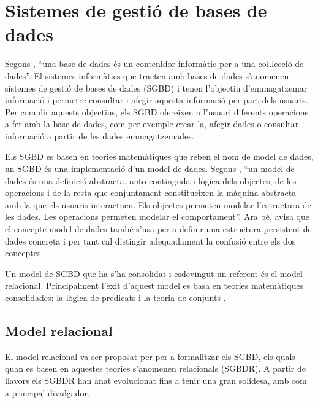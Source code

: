 \section[SGBD]{Sistemes de gestió de bases de dades}
\label{sec:art:sgbd}


Segons \textcite{date:introduction}, ``una base de dades és un contenidor informàtic per a una co\l.lecció de dades''. El sistemes informàtics que tracten amb bases de dades s'anomenen sistemes de gestió de bases de dades (SGBD) i tenen l'objectiu d'emmagatzemar informació i permetre consultar i afegir aquesta informació  per part dels usuaris.
Per complir aquests objectius, els SGBD ofereixen a l'usuari diferents operacions a fer amb la base de dades, com per exemple crear-la, afegir dades o consultar informació a partir de les dades emmagatzemades.

Els SGBD es basen en teories matemàtiques que reben el nom de model de dades, un SGBD és una implementació d'un model de dades.
Segons \citeauthor{date:introduction}, ``un model de dades és una definició abstracta, auto continguda i lògica dels objectes, de les operacions i  de la resta que conjuntament constitueixen la màquina abstracta amb la que els usuaris interactuen. Els objectes permeten modelar l'estructura de les dades. Les operacions permeten modelar el comportament''. Ara bé, \citeauthor{date:introduction} avisa que el concepte model de dades també s'usa per a definir una estructura persistent de dades concreta i per tant cal distingir adequadament la confusió entre els dos conceptes.

Un model de SGBD que ha s'ha consolidat i esdevingut un referent és el model relacional. Principalment l'èxit d'aquest model es basa en teories matemàtiques consolidades: la lògica de predicats i la teoria de conjunts \parencite{date:introduction}.



\subsection{Model relacional}

El model relacional va ser proposat per \textcite{codd70} per a formalitzar els SGBD, els quals quan es basen en aquestes teories s'anomenen relacionals (SGBDR). A partir de llavors els SGBDR han anat evolucionat fins a tenir una gran solidesa, amb \textcite{date:introduction,date06,date:dictionary} com a principal divulgador.


